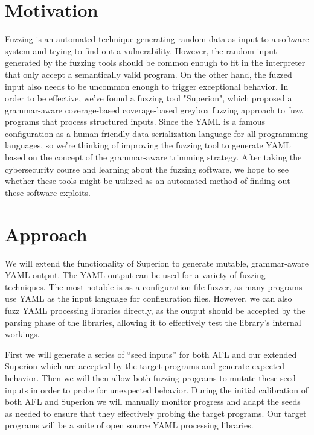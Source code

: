 \documentclass[12pt]{diazessay}
\begin{document}

\section*{Motivation}

Fuzzing is an automated technique generating random data as input to a software system and trying to find out a vulnerability.
However, the random input generated by the fuzzing tools should be common enough to fit in the interpreter that only accept a semantically valid program. On the other hand, the fuzzed input also needs to be uncommon enough to trigger exceptional behavior.
In order to be effective, we've found a fuzzing tool "Superion"\cite{superion}, which proposed a grammar-aware coverage-based coverage-based greybox fuzzing approach to fuzz programs that process structured inputs.
Since the YAML is a famous configuration as a human-friendly data serialization language for all programming languages, so we're thinking of improving the fuzzing tool to generate YAML based on the concept of the grammar-aware trimming strategy.
After taking the cybersecurity course and learning about the fuzzing software, we hope to see whether these tools might be utilized as an automated method of finding out these software exploits.


\section*{Approach}

We will extend the functionality of Superion to generate mutable, grammar-aware YAML output.
The YAML output can be used for a variety of fuzzing techniques.
The most notable is as a configuration file fuzzer, as many programs use YAML as the input language for configuration files.
However, we can also fuzz YAML processing libraries\cite{libfYAML}\cite{libYAML}\cite{YAMLcpp}\cite{rapidYAML}\cite{miniYAML} directly, as the output should be accepted by the parsing phase of the libraries, allowing it to effectively test the library's internal workings.

First we will generate a series of ``seed inputs'' for both AFL and our extended Superion which are accepted by the target programs and generate expected behavior.
Then we will then allow both fuzzing programs to mutate these seed inputs\cite{Seed} in order to probe for unexpected behavior.
During the initial calibration of both AFL and Superion we will manually monitor progress and adapt the seeds as needed to ensure that they effectively probing the target programs.
Our target programs will be a suite of open source YAML processing libraries.
\end{document}
